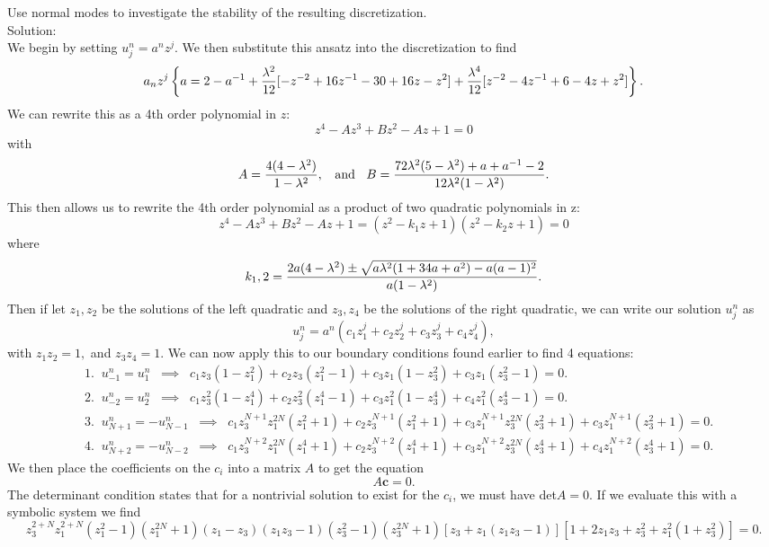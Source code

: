  \item Use normal modes to investigate the stability of the resulting discretization.\\
 
 Solution:\\
 
 We begin by setting $u_j^n=a^nz^j$. We then substitute this ansatz into the discretization to find
 $$a_nz^j\left\{ a =2-a^{-1}+\frac{\lambda^2}{12}[-z^{-2}+16z^{-1}-30+16 z-z^2]+\frac{\lambda^4}{12}[z^{-2}-4z^{-1}+6-4z+z^2]\right\}.$$
 We can rewrite this as a 4th order polynomial in $z$:
 $$z^4-Az^3+Bz^2-Az+1=0$$
 with 
 $$A=\frac{4(4-\lambda^2)}{1-\lambda^2},\;\;\text{ and }\;\; B=\frac{72\lambda^2(5-\lambda^2)+a+a^{-1}-2}{12\lambda^2(1-\lambda^2)}.$$
 This then allows us to rewrite the 4th order polynomial as a product of two quadratic polynomials in z:
 $$z^4-Az^3+Bz^2-Az+1=(z^2-k_1z+1)(z^2-k_2z+1)=0$$
 where 
 $$k_1,2=\frac{2a(4-\lambda^2)\pm\sqrt{a\lambda^2(1+34a+a^2)-a(a-1)^2}}{a(1-\lambda^2)}.$$
 Then if let $z_1,z_2$ be the solutions of the left quadratic and $z_3,z_4$ be the solutions of the right quadratic, we can write our solution $u_j^n$ as
 $$u_j^n=a^n(c_1z_1^j+c_2z_2^j+c_3z_3^j+c_4z_4^j),$$
 with $z_1z_2=1,$ and $z_3z_4=1.$ 
 We can now apply this to our boundary conditions found earlier to find 4 equations:
 \begin{align*}
&1.\;\; u_{-1}^n=u_1^n\;\;\implies\;\; c_1z_3(1-z_1^2)+c_2z_3(z_1^2-1)+c_3z_1(1-z_3^2)+c_3z_1(z_3^2-1)=0.\\
&2.\;\; u_{-2}^n=u_2^n\;\;\implies\;\; c_1z_3^2(1-z_1^4)+c_2z_3^2(z_1^4-1)+c_3z_1^2(1-z_3^4)+c_4z_1^2(z_3^4-1)=0.\\
&3. \;\; u_{N+1}^n=-u_{N-1}^n\;\; \implies\;\; c_1z_3^{N+1}z_1^{2N}(z_1^2+1)+c_2z_3^{N+1}(z_1^2+1)+c_3z_1^{N+1}z_3^{2N}(z_3^2+1)+c_3z_1^{N+1}(z_3^2+1)=0.\\
&4.\;\; u_{N+2}^n=-u_{N-2}^n\;\;\implies\;\; c_1z_3^{N+2}z_1^{2N}(z_1^4+1)+c_2z_3^{N+2}(z_1^4+1)+c_3z_1^{N+2}z_3^{2N}(z_3^4+1)+c_4z_1^{N+2}(z_3^4+1)=0.
\end{align*}
We then place the coefficients on the $c_i$ into a matrix $A$ to get the equation
$$A\mathbf{c}=0.$$
 The determinant condition states that for a nontrivial solution to exist for the $c_i$, we must have det$A=0$. If we evaluate this with a symbolic system we find
 $$z_3^{2+N}z_1^{2+N}(z_1^2-1)(z_1^{2N}+1)(z_1-z_3)(z_1z_3-1)(z_3^2-1)(z_3^{2N}+1)[z_3+z_1(z_1z_3-1)][1+2z_1z_3+z_3^2+z_1^2(1+z_3^2)]=0.$$

